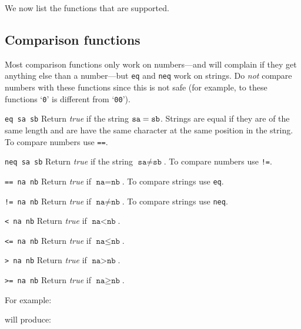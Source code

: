 We now list the functions that are supported.

\subsection{Comparison functions}
Most comparison functions only work on numbers---and will complain if they
get anything else than a number---but \texttt{eq} and \texttt{neq} work on strings.
Do \emph{not} compare numbers with these functions
since this is not safe (for example, to these functions `\texttt{0}'
is different from `\texttt{00}').

\begin{desctab}
\item[\texttt{eq sa sb}]
Return \textit{true} if the string $\verb'sa' = \verb'sb'$.
Strings are equal if they are of the same length and are have the
same character at the same position in the string.
To compare numbers use \texttt{==}.

\item[\texttt{neq sa sb}]
Return \textit{true} if the string $\texttt{sa} \not= \texttt{sb}$.
To compare numbers use \verb'!='.

\item[\texttt{== na nb}\index{==@\texttt{==}}]
Return \textit{true} if $\texttt{na} = \texttt{nb}$.
To compare strings use \texttt{eq}.

\item[\texttt{!= na nb}\index{"!=@\texttt{"!=}}]
Return \textit{true} if $\texttt{na} \not= \texttt{nb}$.
To compare strings use \texttt{neq}.

\item[\texttt{< na nb}\index{<@\texttt{<}}]
Return \textit{true} if $\texttt{na} < \texttt{nb}$.

\item[\texttt{<= na nb}\index{<=@\texttt{<=}}]
Return \textit{true} if $\texttt{na} \leq \texttt{nb}$.

\item[\texttt{> na nb}\index{>@\texttt{>}}]
Return \textit{true} if $\texttt{na} > \texttt{nb}$.

\item[\texttt{>= na nb}\index{>=@\texttt{>=}}]
Return \textit{true} if $\texttt{na} \geq \texttt{nb}$.
\end{desctab}
For example:
\begin{showfile}

\end{showfile}
will produce:
\begin{showfile}

\end{showfile}

